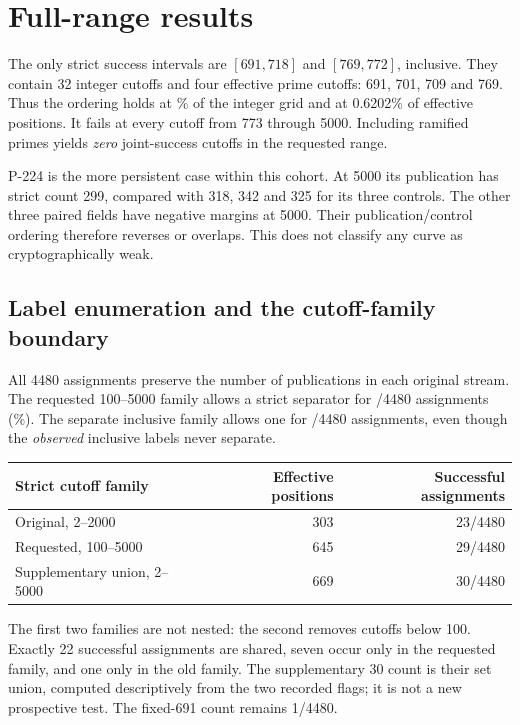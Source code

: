 \documentclass[10pt]{article}
\begin{document}
\section{Full-range results}
The only strict success intervals are $[691,718]$ and $[769,772]$, inclusive.
They contain 32 integer cutoffs and four effective prime cutoffs:
691, 701, 709 and 769. Thus the ordering holds at \StrictIntegerPct\%{} of
the integer grid and at 0.6202\% of effective positions. It fails at every
cutoff from 773 through 5000. Including ramified primes yields
\emph{zero} joint-success cutoffs in the requested range.

\begin{table}[!ht]
\centering

\caption{Within-field strict ordering across all 4901 integer cutoffs.
A positive margin means every paired publication has a smaller count than
every named unpublished candidate in that field. The percentages describe this
grid, not a sampling probability or statistical comparison between fields.}
\label{tab:fields}
\end{table}

P-224 is the more persistent case within this cohort. At 5000 its publication
has strict count 299, compared with 318, 342 and 325 for its three controls.
The other three paired fields have negative margins at 5000. Their
publication/control ordering therefore reverses or overlaps. This does not
classify any curve as cryptographically weak.

\subsection{Label enumeration and the cutoff-family boundary}
All 4480 assignments preserve the number of publications in each original
stream. The requested 100--5000 family allows a strict separator for
\StrictLabels/4480 assignments (\StrictLabelsPct\%). The separate inclusive
family allows one for \InclusiveLabels/4480 assignments, even though the
\emph{observed} inclusive labels never separate.

\begin{center}
\begin{tabular}{lrr}
\toprule
Strict cutoff family & Effective positions & Successful assignments\\
\midrule
Original, 2--2000 & 303 & 23/4480\\
Requested, 100--5000 & 645 & 29/4480\\
Supplementary union, 2--5000 & 669 & 30/4480\\
\bottomrule
\end{tabular}
\end{center}
The first two families are not nested: the second removes cutoffs below 100.
Exactly 22 successful assignments are shared, seven occur only in the requested
family, and one only in the old family. The supplementary 30 count is their
set union, computed descriptively from the two recorded flags; it is not a new
prospective test. The fixed-691 count remains 1/4480.
\end{document}

